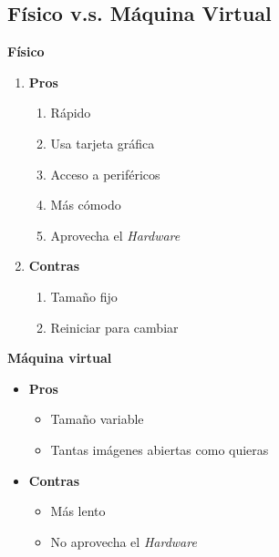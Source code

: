 \documentclass[aspectratio=43]{beamer}
\begin{document}
    \subsection{Físico v.s. Máquina Virtual}
    \begin{frame}{\secname}{\subsecname}
        \begin{multicols}{2}
            \textbf{Físico}
            \begin{enumerate}
                \item \textbf{Pros}
                \begin{enumerate}
                    \item Rápido
                    \item Usa tarjeta gráfica
                    \item Acceso a periféricos
                    \item Más cómodo
                    \item Aprovecha el \textit{Hardware}
                \end{enumerate}
                \item \textbf{Contras}
                \begin{enumerate}
                    \item Tamaño fijo
                    \item Reiniciar para cambiar
                \end{enumerate}
            \end{enumerate}
            \newpage
            \textbf{Máquina virtual}
            \begin{itemize}
                \item \textbf{Pros}
                \begin{itemize}
                    \item Tamaño variable
                    \item Tantas imágenes abiertas como quieras
                \end{itemize}
                \item \textbf{Contras}
                \begin{itemize}
                    \item Más lento
                    \item No aprovecha el \textit{Hardware}
                \end{itemize}
            \end{itemize}
        \end{multicols}

\end{frame}
\end{document}
